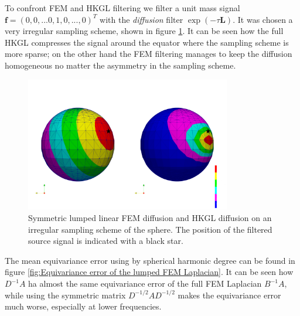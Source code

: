 To confront FEM and HKGL filtering we filter a unit mass signal \\$\mathbf{f}=(0,0,...0,1,0,...,0)^T$ with the \textit{diffusion} filter $\exp{(-\tau \mathbf L)}$. It was chosen a very irregular sampling scheme, shown in figure \ref{fig:FEM lumped symmetric diffusion on irregular sampling}. It can be seen how the full HKGL compresses the signal around the equator where the sampling scheme is more sparse; on the other hand the FEM filtering manages to keep the diffusion homogeneous no matter the asymmetry in the sampling scheme. 
\begin{figure}[h!]
	\centering
	\includegraphics[width=0.8\textwidth]{figs/Chapter3/diffusion.png}
	\caption{\label{fig:FEM lumped symmetric diffusion on irregular sampling}Symmetric lumped linear FEM diffusion and HKGL diffusion on an irregular sampling scheme of the sphere. The position of the filtered source signal is indicated with a black star.}
\end{figure}
The mean equivariance error using by spherical harmonic degree can be found in figure \ref{fig:Equivariance error of the lumped FEM Laplacian}. It can be seen how $D^{-1}A$ ha almost the same equivariance error of the full FEM Laplacian $B^{-1}A$, while using the symmetric matrix $D^{-1/2}AD^{-1/2}$ makes the equivariance error much worse, especially at lower frequencies.
